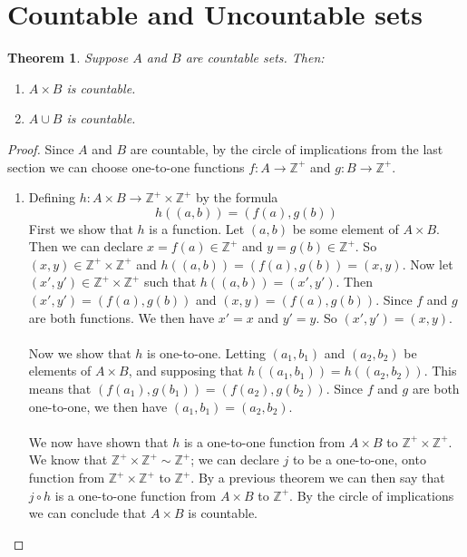 \documentclass{report}
\newtheorem*{theorem}{Theorem}
\theoremstyle{definition}
\begin{document}
\section{Countable and Uncountable sets}
\begin{theorem}
Suppose $A$ and $B$ are countable sets. Then:
\begin{enumerate}
\item $A\times B$ is countable.
\item $A\cup B$ is countable.
\end{enumerate}
\end{theorem}
\begin{proof}
Since $A$ and $B$ are countable, by the circle of implications from the last section we can choose one-to-one functions $f:A\to\mathbb Z^+$ and $g:B\to\mathbb Z^+$.
\begin{enumerate}
\item Defining $h:A\times B\to\mathbb Z^+\times\mathbb Z^+$ by the formula
\begin{equation*}
h((a,b))=(f(a),g(b))
\end{equation*}
First we show that $h$ is a function. Let $(a,b)$ be some element of $A\times B$. Then we can declare $x=f(a)\in\mathbb Z^+$ and $y=g(b)\in\mathbb Z^+$.
So $(x,y)\in\mathbb Z^+\times\mathbb Z^+$ and $h((a,b))=(f(a),g(b))=(x,y)$. Now
let $(x',y')\in\mathbb Z^+\times\mathbb Z^+$ such that $h((a,b))=(x',y')$. Then 
$(x',y')=(f(a),g(b))$ and $(x,y)=(f(a),g(b))$. Since $f$ and $g$ are both functions. We then have $x'=x$ and $y'=y$.
So $(x',y')=(x,y)$.\\
\vspace{1mm}\\
Now we show that $h$ is one-to-one. Letting $(a_1,b_1)$ and $(a_2,b_2)$ be elements of $A\times B$, and supposing that $h((a_1,b_1))=h((a_2,b_2))$. This means that
$(f(a_1),g(b_1))=(f(a_2),g(b_2))$. Since $f$ and $g$ are both one-to-one, we then have $(a_1,b_1)=(a_2,b_2)$.\\
\vspace{1mm}\\
We now have shown that $h$ is a one-to-one function from $A\times B$ to $\mathbb Z^+\times\mathbb Z^+$. We know that $\mathbb Z^+\times\mathbb Z^+\sim\mathbb Z^+$; we can declare $j$ to be a
one-to-one, onto function from $\mathbb Z^+\times\mathbb Z^+$ to $\mathbb Z^+$. By a previous theorem we can then say that $j\circ h$ is a one-to-one function from $A\times B$ to $\mathbb Z^+$.
By the circle of implications we can conclude that $A\times B$ is countable.\\

\end{enumerate}
\end{proof}
\end{document}
